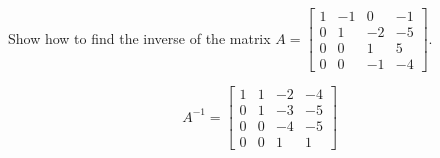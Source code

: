 
\begin{exerciseStatement}


Show how to find the inverse of the matrix \(A= \left[\begin{array}{cccc}
1 & -1 & 0 & -1 \\
0 & 1 & -2 & -5 \\
0 & 0 & 1 & 5 \\
0 & 0 & -1 & -4
\end{array}\right] \).


\end{exerciseStatement}
    
\begin{exerciseAnswer} 
\[A^{-1}= \left[\begin{array}{cccc}
1 & 1 & -2 & -4 \\
0 & 1 & -3 & -5 \\
0 & 0 & -4 & -5 \\
0 & 0 & 1 & 1
\end{array}\right] \]
\end{exerciseAnswer}
    
